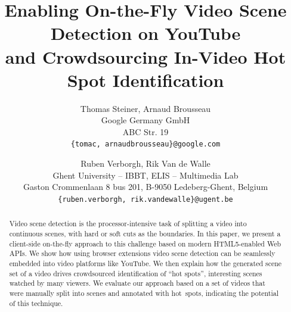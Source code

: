 \documentclass[10pt,twocolumn,letterpaper]{article}
\begin{document}
\title{Enabling On-the-Fly Video Scene Detection on YouTube\\ and Crowdsourcing In-Video Hot Spot Identification}

\author{Thomas Steiner, Arnaud Brousseau\\
Google Germany GmbH\\
ABC Str. 19\\
{\tt\small \{tomac, arnaudbrousseau\}@google.com}
\and
Ruben Verborgh, Rik Van de Walle \\
Ghent University -- IBBT, ELIS -- Multimedia Lab\\
Gaston Crommenlaan 8 bus 201, B-9050 Ledeberg-Ghent, Belgium\\
{\tt\small \{ruben.verborgh, rik.vandewalle\}@ugent.be}
}

\maketitle

\begin{abstract}
Video scene detection is the processor-intensive task of splitting a video into continuous scenes, with hard or soft cuts as the boundaries. In this paper, we present a client-side on-the-fly approach to this challenge based on modern HTML5-enabled Web APIs. We show how using browser extensions video scene detection can be seamlessly embedded into video platforms like YouTube.
We then explain how the generated scene set of a video drives crowdsourced identification of ``hot spots'', interesting scenes watched by many viewers. We evaluate our approach based on a set of videos that were manually split into scenes and annotated with hot~spots, indicating the potential of this technique.
\end{abstract}

\end{document}
